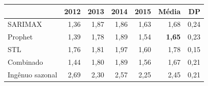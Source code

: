 \begin{tabular}{lrrrrrr}
\toprule
 & 2012 & 2013 & 2014 & 2015 & Média & DP \\
\midrule
SARIMAX & 1,36 & 1,87 & 1,86 & 1,63 & 1,68 & 0,24 \\
Prophet & 1,39 & 1,78 & 1,89 & 1,54 & \textbf{1,65} & 0,23 \\
STL & 1,76 & 1,81 & 1,97 & 1,60 & 1,78 & 0,15 \\
Combinado & 1,44 & 1,80 & 1,89 & 1,56 & 1,67 & 0,21 \\
Ingênuo sazonal & 2,69 & 2,30 & 2,57 & 2,25 & 2,45 & 0,21 \\
\bottomrule
\end{tabular}
